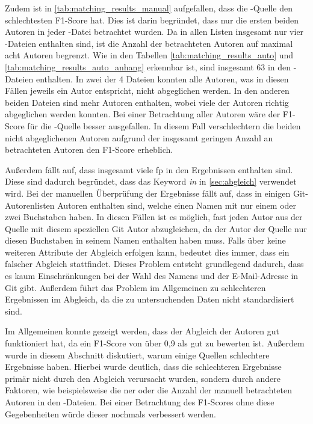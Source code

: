 Zudem ist in \autoref{tab:matching_results_manual} aufgefallen, dass die -Quelle den schlechtesten F1-Score hat.
Dies ist darin begründet, dass nur die ersten beiden Autoren in jeder -Datei betrachtet wurden.
Da in allen Listen insgesamt nur vier -Dateien enthalten sind, ist die Anzahl der betrachteten Autoren auf maximal acht Autoren begrenzt.
Wie in den Tabellen \ref{tab:matching_results_auto} und \ref{tab:matching_results_auto_anhang} erkennbar ist, sind insgesamt 63 in den -Dateien enthalten.
In zwei der 4 Dateien konnten alle Autoren, was in diesen Fällen jeweils ein Autor entspricht, nicht abgeglichen werden.
In den anderen beiden Dateien sind mehr Autoren enthalten, wobei viele der Autoren richtig abgeglichen werden konnten.
Bei einer Betrachtung aller Autoren wäre der F1-Score für die -Quelle besser ausgefallen.
In diesem Fall verschlechtern die beiden nicht abgeglichenen Autoren aufgrund der insgesamt geringen Anzahl an betrachteten Autoren den F1-Score erheblich.

Außerdem fällt auf, dass insgesamt viele \gls{fp} in den Ergebnissen enthalten sind.
Diese sind dadurch begründet, dass das Keyword \emph{in} in \autoref{sec:abgleich} verwendet wird.
Bei der manuellen Überprüfung der Ergebnisse fällt auf, dass in einigen Git-Autorenlisten Autoren enthalten sind, welche einen Namen mit nur einem oder zwei Buchstaben haben.
In diesen Fällen ist es möglich, fast jeden Autor aus der Quelle mit diesem speziellen Git Autor abzugleichen, da der Autor der Quelle nur diesen Buchstaben in seinem Namen enthalten haben muss.
Falls über keine weiteren Attribute der Abgleich erfolgen kann, bedeutet dies immer, dass ein falscher Abgleich stattfindet.
Dieses Problem entsteht grundlegend dadurch, dass es kaum Einschränkungen bei der Wahl des Namens und der E-Mail-Adresse in Git gibt.
Außerdem führt das Problem im Allgemeinen zu schlechteren Ergebnissen im Abgleich, da die zu untersuchenden Daten nicht standardisiert sind.

Im Allgemeinen konnte gezeigt werden, dass der Abgleich der Autoren gut funktioniert hat, da ein F1-Score von über 0,9 als gut zu bewerten ist.
Außerdem wurde in diesem Abschnitt diskutiert, warum einige Quellen schlechtere Ergebnisse haben.
Hierbei wurde deutlich, dass die schlechteren Ergebnisse primär nicht durch den Abgleich verursacht wurden, sondern durch andere Faktoren, wie beispielsweise die \gls{ner} oder die Anzahl der manuell betrachteten Autoren in den -Dateien.
Bei einer Betrachtung des F1-Scores ohne diese Gegebenheiten würde dieser nochmals verbessert werden.

